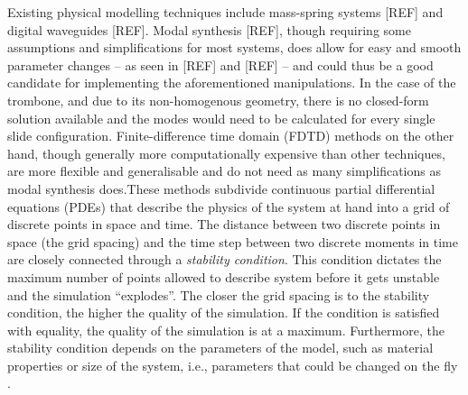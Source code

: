 Existing physical modelling techniques include mass-spring systems [REF] and digital waveguides [REF]. Modal synthesis [REF], though requiring some assumptions and simplifications for most systems, does allow for easy and smooth parameter changes -- as seen in [REF] and [REF] -- and could thus be a good candidate for implementing the aforementioned manipulations. In the case of the trombone, and due to its non-homogenous geometry, there is no closed-form solution available and the modes would need to be calculated for every single slide configuration. Finite-difference time domain (FDTD) methods on the other hand, though generally more computationally expensive than other techniques, are more flexible and generalisable and do not need as many simplifications as modal synthesis does. These methods subdivide continuous partial differential equations (PDEs) that describe the physics of the system at hand into a grid of discrete points in space and time. 
%
%
The distance between two discrete points in space (the grid spacing) and the time step between two discrete moments in time are closely connected through a \textit{stability condition}. This condition dictates the maximum number of points allowed to describe system before it gets unstable and the simulation ``explodes''. The closer the grid spacing is to the stability condition, the higher the quality of the simulation. If the condition is satisfied with equality, the quality of the simulation is at a maximum.  
Furthermore, the stability condition depends on the parameters of the model, such as material properties or size of the system, i.e., parameters that could be changed on the fly \SBcomment[As above].

